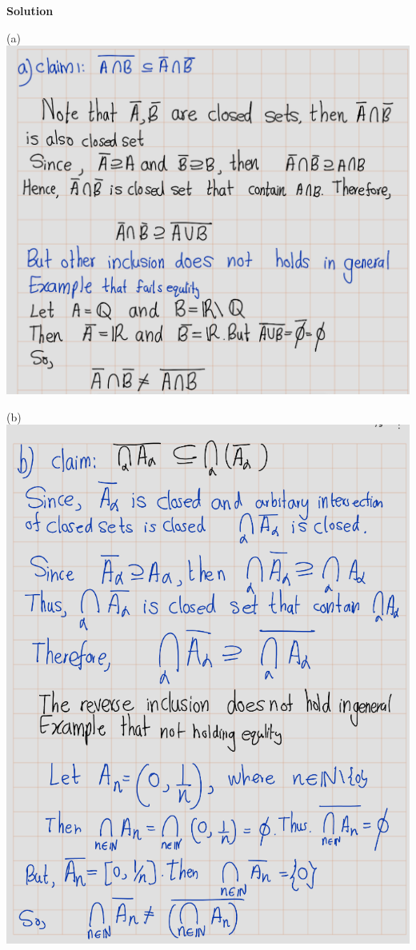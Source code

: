 \documentclass[
]{book}
\theoremstyle{definition}
\theoremstyle{definition}
\theoremstyle{definition}
\theoremstyle{definition}
\theoremstyle{remark}
\begin{document}
\textbf{Solution}

(a)\\
\includegraphics{figures/Exercises/Ex 2.17/ex-8-1.png}

(b)\\
\includegraphics{figures/Exercises/Ex 2.17/ex-8-2.png}
\end{document}
